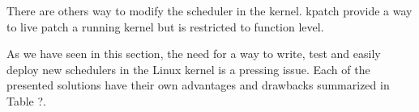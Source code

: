 \par There are others way to modify the scheduler in the kernel. kpatch\cite{} provide a way to live patch a running kernel but is restricted to function level. 
\par As we have seen in this section, the need for a way to write, test and easily deploy new schedulers in the Linux kernel is a pressing issue. Each of the presented solutions have their own advantages and drawbacks summarized in Table ?.